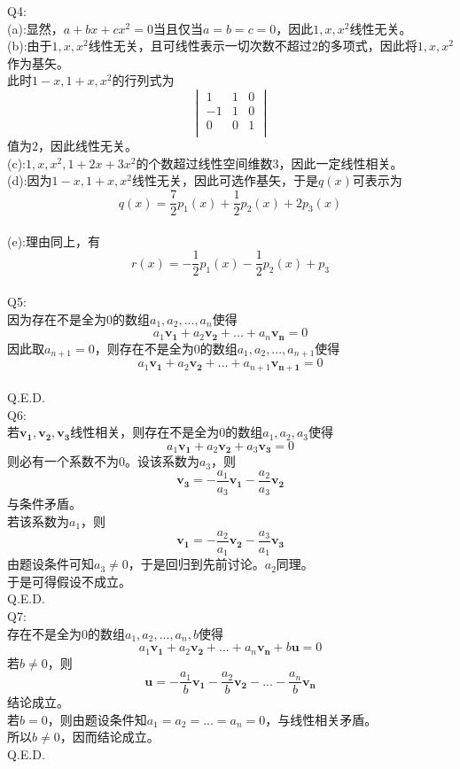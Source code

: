 \documentclass[utf8]{ctexart}
\begin{document}
Q4:\\
(a):显然，$a+bx+cx^2=0$当且仅当$a=b=c=0$，因此$1,x,x^2$线性无关。\\
(b):由于$1,x,x^2$线性无关，且可线性表示一切次数不超过$2$的多项式，因此将$1,x,x^2$作为基矢。\\此时$1-x,1+x,x^2$的行列式为
$$
\begin{vmatrix}
	1  &1  &0\\
	-1  &1  &0\\
	0  &0  &1\\
\end{vmatrix}
$$
值为$2$，因此线性无关。\\
(c):$1,x,x^2,1+2x+3x^2$的个数超过线性空间维数$3$，因此一定线性相关。\\
(d):因为$1-x,1+x,x^2$线性无关，因此可选作基矢，于是$q(x)$可表示为$$q(x)=\frac{7}{2}p_1(x)+\frac{1}{2}p_2(x)+2p_3(x)$$\\
(e):理由同上，有$$r(x)=-\frac{1}{2}p_1(x)-\frac{1}{2}p_2(x)+p_3$$\\
Q5:\\
因为存在不是全为$0$的数组$a_1,a_2,...,a_n$使得
$$a_1\mathbf{v_1}+a_2\mathbf{v_2}+...+a_n\mathbf{v_n}=0$$
因此取$a_{n+1}=0$，则存在不是全为$0$的数组$a_1,a_2,...,a_{n+1}$使得
$$a_1\mathbf{v_1}+a_2\mathbf{v_2}+...+a_{n+1}\mathbf{v_{n+1}}=0$$\\
Q.E.D.\\
Q6:\\
若$\mathbf{v_1},\mathbf{v_2},\mathbf{v_3}$线性相关，则存在不是全为$0$的数组$a_1,a_2,a_3$使得
$$a_1\mathbf{v_1}+a_2\mathbf{v_2}+a_3\mathbf{v_3}=0$$
则必有一个系数不为$0$。设该系数为$a_3$，则
$$\mathbf{v_3}=-\frac{a_1}{a_3}\mathbf{v_1}-\frac{a_2}{a_3}\mathbf{v_2}$$
与条件矛盾。\\
若该系数为$a_1$，则
$$\mathbf{v_1}=-\frac{a_2}{a_1}\mathbf{v_2}-\frac{a_3}{a_1}\mathbf{v_3}$$
由题设条件可知$a_3\neq 0$，于是回归到先前讨论。$a_2$同理。\\
于是可得假设不成立。\\
Q.E.D.\\
Q7:\\
存在不是全为$0$的数组$a_1,a_2,...,a_n,b$使得
$$a_1\mathbf{v_1}+a_2\mathbf{v_2}+...+a_n\mathbf{v_n}+b\mathbf{u}=0$$
若$b\neq 0$，则
$$\mathbf{u}=-\frac{a_1}{b}\mathbf{v_1}-\frac{a_2}{b}\mathbf{v_2}-...-\frac{a_n}{b}\mathbf{v_n}$$
结论成立。\\
若$b=0$，则由题设条件知$a_1=a_2=...=a_n=0$，与线性相关矛盾。\\
所以$b\neq 0$，因而结论成立。\\
Q.E.D.
\end{document}
